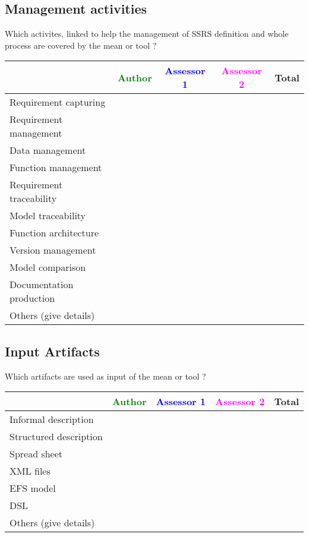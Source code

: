 \subsection{Management activities}

Which activites, linked to help the management of SSRS definition and whole process are covered by the mean or tool  ?

\begin{tabular}{|l | c | c | c | c|}
\hline
& \textcolor{green}{Author} & \textcolor{blue}{Assessor 1} & \textcolor{magenta}{Assessor 2} & Total \\
\hline 
Requirement capturing & & & &  \\
\hline
Requirement management  & & & & \\
\hline
Data management & & & & \\
\hline
Function management & & & & \\
\hline
Requirement traceability  & & & & \\
\hline
Model traceability & & & & \\
\hline
Function architecture & & & & \\
\hline
Version management & & & & \\
\hline
Model comparison & & & & \\
\hline
Documentation production & & & & \\
\hline
Others (give details) & & & & \\
\hline
\end{tabular}


\subsection{Input Artifacts}

Which artifacts are used as input of the mean or tool  ? 


\begin{tabular}{|l | c | c | c | c|}
\hline
& \textcolor{green}{Author} & \textcolor{blue}{Assessor 1} & \textcolor{magenta}{Assessor 2} & Total \\
\hline 
Informal description & & & &  \\
\hline
Structured description & & & & \\
\hline
Spread sheet & & & & \\
\hline
XML files & & & & \\
\hline
EFS model & & & & \\
\hline
DSL & & & & \\
\hline
Others (give details) & & & & \\
\hline
\end{tabular}



